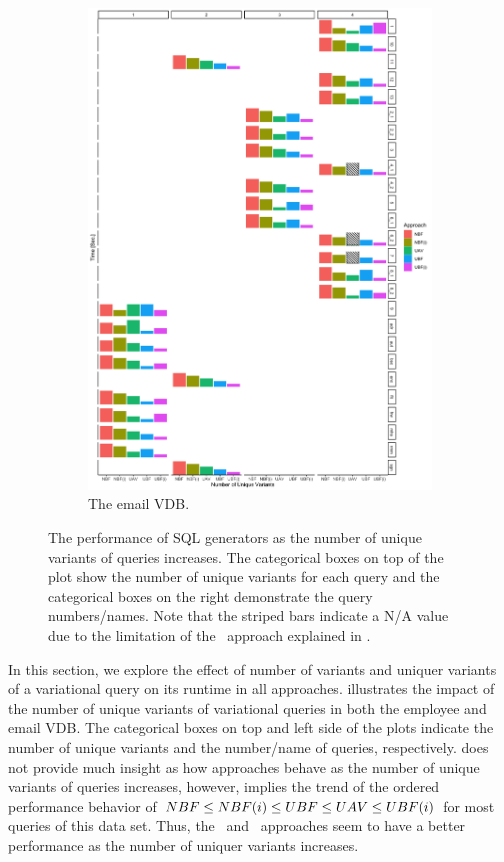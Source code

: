 \begin{figure}
\begin{subfigure}{.6\linewidth}
\includegraphics[width=\textwidth] {figs/plots/enron-comp-var.png}
\caption[The email VDB]{The email VDB.}
\label{fig:enron-var-comp}
\end{subfigure}
\caption[The performance of SQL generators as the number of unique variants of queries increases]{The performance of SQL generators as the number of unique variants of queries increases. The categorical boxes on top of the plot show the number of
unique variants for each query and the categorical boxes on the right demonstrate the query 
numbers/names. Note that the striped bars indicate a N/A value due to the limitation of the
\uav\ approach explained in .}
\label{fig:var-comp}
\end{figure}


In this section, we explore the effect of number of variants and uniquer variants of a 
variational query on its runtime in all approaches. 
%
 illustrates the impact of the number of unique variants of variational
queries in both the employee and email VDB. 
%
The categorical boxes on top and left side of the plots indicate the number of unique
variants and the number/name of queries, respectively. 
%
 does 
not provide much insight as how approaches behave as the number of unique
variants of queries increases, however,  implies the trend
of the ordered performance behavior of $NBF \leq NBF(i) \leq UBF \leq UAV \leq UBF(i)$
for most queries of this data set. Thus, the \uav\ and \ubfi\ approaches seem to have
a better performance as the number of uniquer variants increases. 


